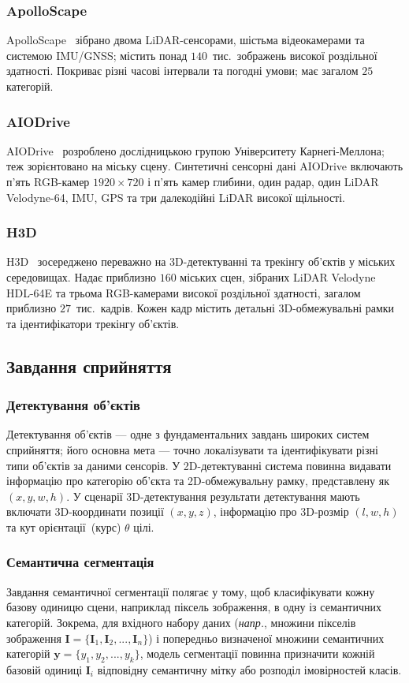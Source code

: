 \subsubsection{ApolloScape}
ApolloScape~\cite{huang2018apolloscape} зібрано двома LiDAR-сенсорами, шістьма відеокамерами та системою IMU/GNSS; містить понад $140$~тис.\ зображень високої роздільної здатності. Покриває різні часові інтервали та погодні умови; має загалом $25$ категорій.

\subsubsection{AIODrive}
AIODrive~\cite{weng2020all} розроблено дослідницькою групою Університету Карнегі-Меллона; теж зорієнтовано на міську сцену. Синтетичні сенсорні дані AIODrive включають п'ять RGB-камер $1920 \times 720$ і п'ять камер глибини, один радар, один LiDAR Velodyne-64, IMU, GPS та три далекодійні LiDAR високої щільності.

\subsubsection{H3D}
H3D~\cite{patil2019h3d} зосереджено переважно на 3D-детектуванні та трекінгу об'єктів у міських середовищах. Надає приблизно $160$ міських сцен, зібраних LiDAR Velodyne HDL-64E та трьома RGB-камерами високої роздільної здатності, загалом приблизно $27$~тис.\ кадрів. Кожен кадр містить детальні 3D-обмежувальні рамки та ідентифікатори трекінгу об'єктів.


\subsection{Завдання сприйняття}
\subsubsection{Детектування об'єктів}
Детектування об'єктів — одне з фундаментальних завдань широких систем сприйняття; його основна мета — точно локалізувати та ідентифікувати різні типи об'єктів за даними сенсорів.
У 2D-детектуванні система повинна видавати інформацію про категорію об'єкта та 2D-обмежувальну рамку, представлену як $(x, y, w, h)$.
У сценарії 3D-детектування результати детектування мають включати 3D-координати позиції $(x, y, z)$, інформацію про 3D-розмір $(l, w, h)$ та кут орієнтації~(курс) $\theta$ цілі.

\subsubsection{Семантична сегментація}
Завдання семантичної сегментації полягає у тому, щоб класифікувати кожну базову одиницю сцени, наприклад піксель зображення, в одну із семантичних категорій.
Зокрема, для вхідного набору даних (\textit{напр.}, множини пікселів зображення $\bm{I} = \{\bm{I}_1, \bm{I}_2, ..., \bm{I}_n\}$) і попередньо визначеної множини семантичних категорій $\bm{y} = \{y_1, y_2, ..., y_k\}$, модель сегментації повинна призначити кожній базовій одиниці $\bm{I}_i$ відповідну семантичну мітку або розподіл імовірностей класів.


